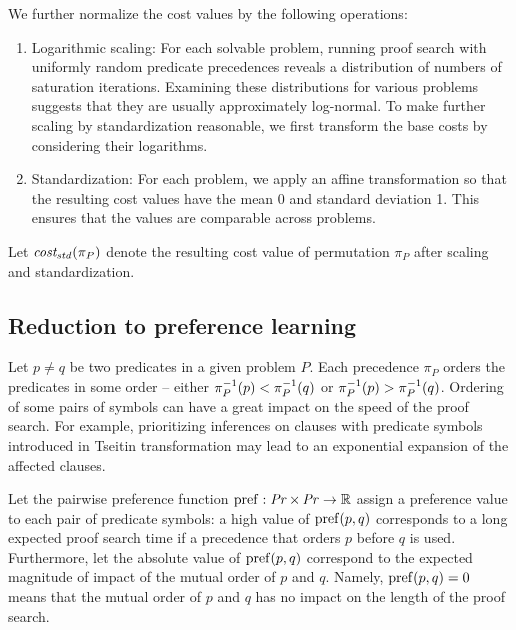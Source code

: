 We further normalize the cost values by the following operations:

\begin{enumerate}
	\item Logarithmic scaling:
	For each solvable problem, running proof search with uniformly random predicate precedences
	reveals a distribution of numbers of saturation iterations.
	Examining these distributions for various problems suggests that they are usually
	approximately log-normal.
	To make further scaling by standardization reasonable,
	we first transform the base costs by considering their logarithms.
	\item Standardization\cite{?}:
	For each problem,
	we apply an affine transformation so that the resulting cost values
	have the mean 0 and standard deviation 1.
	This ensures that the values are comparable across problems.
\end{enumerate}

Let \(\operatorname{\mathit{cost_{std}}}(\pi_P)\) denote the resulting cost value of permutation \(\pi_P\)
after scaling and standardization.

\subsection{Reduction to preference learning}

Let \(p \neq q\) be two predicates in a given \gls{problem} \(P\).
Each precedence \(\pi_P\) orders the predicates in some order --
either \(\pi_P^{-1}(p) < \pi_P^{-1}(q)\) or \(\pi_P^{-1}(p) > \pi_P^{-1}(q)\).
Ordering of some pairs of symbols can have a great impact on the speed of the proof search.
For example, prioritizing inferences on clauses with predicate symbols
introduced in Tseitin transformation
may lead to an exponential expansion of the affected clauses.

Let the pairwise preference
function \(\operatorname{pref} : \operatorname{\mathit{Pr}} \times \operatorname{\mathit{Pr}} \rightarrow \operatorname{\mathbb{R}}\)
assign a preference value to each pair of predicate symbols:
a high value of \(\operatorname{pref}(p, q)\) corresponds to a long expected proof search time
if a precedence that orders \(p\) before \(q\) is used.
Furthermore, let the absolute value of \(\operatorname{pref}(p, q)\)
correspond to the expected magnitude of impact of the mutual order of \(p\) and \(q\).
Namely, \(\operatorname{pref}(p, q) = 0\) means that the mutual order of \(p\) and \(q\)
has no impact on the length of the proof search.


